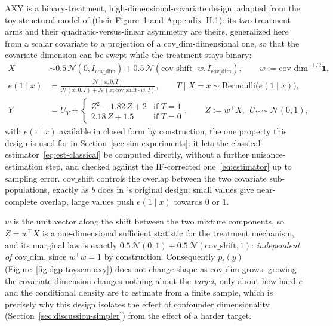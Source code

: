 \documentclass[11pt]{article}
\theoremstyle{plain}
\theoremstyle{definition}
\theoremstyle{remark}
\newcommand{\gps}{e}
\begin{document}
AXY is a binary-treatment, high-dimensional-covariate design, adapted from the toy structural
model of \citet{melnychuk2023flows} (their Figure~1 and Appendix~H.1): its two treatment arms
and their quadratic-versus-linear asymmetry are theirs, generalized here from a scalar
covariate to a projection of a $\mathrm{cov\_dim}$-dimensional one, so that the covariate
dimension can be swept while the treatment stays binary:
\begin{equation}
\begin{aligned}
X &\sim 0.5\,\mathcal N(0,I_{\mathrm{cov\_dim}}) + 0.5\,\mathcal N(\mathrm{cov\_shift}\cdot w, I_{\mathrm{cov\_dim}}),
\qquad w := \mathrm{cov\_dim}^{-1/2}\mathbf{1}, \\
\gps(1\mid x) &= \frac{\mathcal N(x;0,I)}{\mathcal N(x;0,I)+\mathcal N(x;\mathrm{cov\_shift}\cdot w,I)},
\qquad T\mid X=x \sim \mathrm{Bernoulli}\big(\gps(1\mid x)\big), \\
Y &= U_Y + \begin{cases} Z^2 - 1.82\,Z + 2 & \text{if } T=1 \\ 2.18\,Z + 1.5 & \text{if } T=0 \end{cases},
\qquad Z := w^\top X,\ \ U_Y\sim\mathcal N(0,1),
\end{aligned}
\label{eq:app-axy}
\end{equation}
with $\gps(\cdot\mid x)$ available in closed form by construction, the one property this design
is used for in Section~\ref{sec:sim-experiments}: it lets the classical
estimator~\eqref{eq:est-classical} be computed directly, without a further nuisance-estimation
step, and checked against the IF-corrected one~\eqref{eq:estimator} up to sampling error.
$\mathrm{cov\_shift}$ controls the overlap between the two covariate sub-populations, exactly as
$b$ does in \citet{melnychuk2023flows}'s original design: small values give near-complete
overlap, large values push $\gps(1\mid x)$ towards $0$ or $1$.

$w$ is the unit vector along the shift between the two mixture components, so $Z=w^\top X$ is a
one-dimensional sufficient statistic for the treatment mechanism, and its marginal law is exactly
$0.5\,\mathcal N(0,1) + 0.5\,\mathcal N(\mathrm{cov\_shift},1)$: \emph{independent of
$\mathrm{cov\_dim}$}, since $w^\top w = 1$ by construction. Consequently $p_t(y)$
(Figure~\ref{fig:dgp-toyscm-axy}) does not change shape as $\mathrm{cov\_dim}$ grows: growing the
covariate dimension changes nothing about the \emph{target}, only about how hard $\gps$ and the
conditional density are to estimate from a finite sample, which is precisely why this design
isolates the effect of confounder dimensionality (Section~\ref{sec:discussion-simpler}) from the
effect of a harder target.
\end{document}
